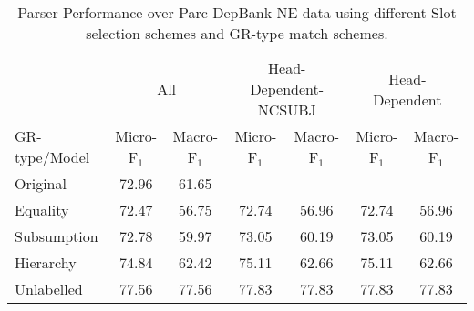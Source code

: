 \documentclass[10pt]{article}
\begin{document}
 \begin{table*}
\begin{tabular}{|l||c|c||c|c||c|c||}
\hline
 & \multicolumn{2}{c||}{All} &  \multicolumn{2}{c||}{Head-Dependent-NCSUBJ} &
 \multicolumn{2}{c||}{Head-Dependent}\\
\cline{2-7}
GR-type/Model & Micro-F$_{1}$ & Macro-F$_{1}$ & Micro-F$_{1}$ &
 Macro-F$_{1}$ & Micro-F$_{1}$ & Macro-F$_{1}$ \\
\hline
Original & 72.96 & 61.65 & - & - & - & -\\
\hline
Equality & 72.47 & 56.75 & 72.74 & 56.96 &  72.74 & 56.96 \\
\hline
Subsumption &  72.78 & 59.97 & 73.05 & 60.19 &  73.05 & 60.19 \\
\hline
Hierarchy &  74.84 &  62.42 & 75.11 & 62.66 & 75.11 & 62.66 \\
\hline
Unlabelled & 77.56 & 77.56 & 77.83 & 77.83 & 77.83 & 77.83  \\
\hline
\end{tabular}
\caption{\label{NEperftable}Parser Performance over Parc DepBank NE
  data using different Slot selection schemes and GR-type match schemes.}
\end{table*}




\end{document}
